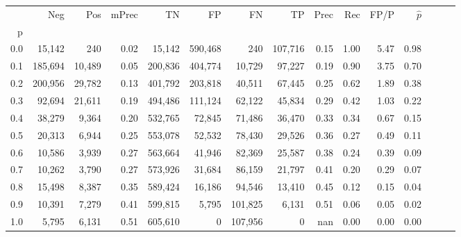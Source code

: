 \begin{tabular}{rrrrrrrrrrrrrrr}
\toprule
{} &      Neg &     Pos & mPrec &       TN &       FP &       FN &       TP &  Prec &   Rec &  FP/P & $\hat{p}$ \\
p   &          &         &       &          &          &          &          &       &       &       &           \\
\midrule
0.0 &   15,142 &     240 &  0.02 &   15,142 &  590,468 &      240 &  107,716 &  0.15 &  1.00 &  5.47 &      0.98 \\
0.1 &  185,694 &  10,489 &  0.05 &  200,836 &  404,774 &   10,729 &   97,227 &  0.19 &  0.90 &  3.75 &      0.70 \\
0.2 &  200,956 &  29,782 &  0.13 &  401,792 &  203,818 &   40,511 &   67,445 &  0.25 &  0.62 &  1.89 &      0.38 \\
0.3 &   92,694 &  21,611 &  0.19 &  494,486 &  111,124 &   62,122 &   45,834 &  0.29 &  0.42 &  1.03 &      0.22 \\
0.4 &   38,279 &   9,364 &  0.20 &  532,765 &   72,845 &   71,486 &   36,470 &  0.33 &  0.34 &  0.67 &      0.15 \\
0.5 &   20,313 &   6,944 &  0.25 &  553,078 &   52,532 &   78,430 &   29,526 &  0.36 &  0.27 &  0.49 &      0.11 \\
0.6 &   10,586 &   3,939 &  0.27 &  563,664 &   41,946 &   82,369 &   25,587 &  0.38 &  0.24 &  0.39 &      0.09 \\
0.7 &   10,262 &   3,790 &  0.27 &  573,926 &   31,684 &   86,159 &   21,797 &  0.41 &  0.20 &  0.29 &      0.07 \\
0.8 &   15,498 &   8,387 &  0.35 &  589,424 &   16,186 &   94,546 &   13,410 &  0.45 &  0.12 &  0.15 &      0.04 \\
0.9 &   10,391 &   7,279 &  0.41 &  599,815 &    5,795 &  101,825 &    6,131 &  0.51 &  0.06 &  0.05 &      0.02 \\
1.0 &    5,795 &   6,131 &  0.51 &  605,610 &        0 &  107,956 &        0 &   nan &  0.00 &  0.00 &      0.00 \\
\bottomrule
\end{tabular}
